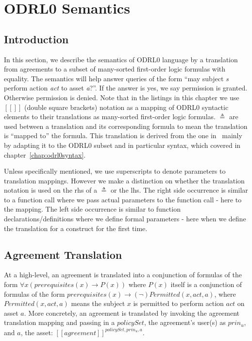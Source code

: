 \chapter{ODRL0 Semantics}\label{chap:semantics}

                  
\section{Introduction}\label{sec:introsemantics}


In this section, we describe the semantics of ODRL0 language by a translation from agreements to a subset of many-sorted first-order logic formulas with equality. The semantics will help answer queries of the form ``may subject \emph{s} perform action \emph{act} to asset \emph{a}?''. If the answer is yes, we say permission is granted. Otherwise permission is denied. Note that in the listings in this chapter we use $[\![]\!]$ (double square brackets) notation as a mapping of ODRL0 syntactic elements to their translations as many-sorted first-order logic formulas. $\triangleq$ are used between a translation and its corresponding formula to mean the translation is ``mapped to'' the formula. This translation is derived from the one in~\cite{pucella2006} mainly by adapting it to the ODRL0 subset and in particular syntax, which covered in chapter~\ref{chap:odrl0syntax}.

Unless specifically mentioned, we use superscripts to denote parameters to translation mappings. However we make a distinction on whether the translation notation is used on the \ac{rhs} of a $\triangleq$ or the \ac{lhs}. The right side occurrence is similar to a function call where we pass actual parameters to the function call - here to the mapping. The left side occurrence is similar to function declarations/definitions where we define formal parameters - here when we define the translation for a construct for the first time. 

\section{Agreement Translation}

At a high-level, an agreement is translated into a conjunction of formulas of the form $\forall x ( prerequisites(x) \rightarrow P(x))$ where $P(x)$ itself is a conjunction of formulas of the form $ prerequisites(x) \rightarrow (\lnot) Permitted (x, act, a)$, where $Permitted (x, act, a)$ means the subject $x$ is permitted to perform action $act$ on asset $a$. More concretely, an agreement is translated by invoking the agreement translation mapping and passing in a $policySet$, the agreement's user(s) as $prin_{u}$, and $a$, the asset: $[\![agreement]\!]^{policySet, prin_{u}, a}$. 


